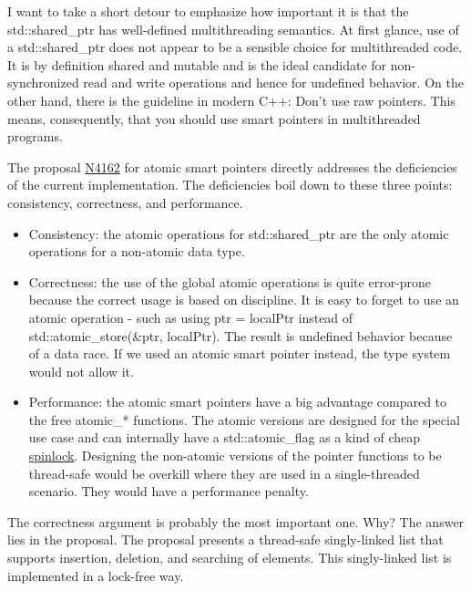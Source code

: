 \begin{tcolorbox}[colback=blue!5!white,colframe=blue!75!black,title={The Importance of being Thread-Safe}]
	
I want to take a short detour to emphasize how important it is that the std::shared\_ptr has well-defined multithreading semantics. At first glance, use of a std::shared\_ptr does not appear to be a sensible choice for multithreaded code. It is by definition shared and mutable and is the ideal candidate for non-synchronized read and write operations and hence for undefined behavior. On the other hand, there is the guideline in modern C++: Don’t use raw pointers. This means, consequently, that you should use smart pointers in multithreaded programs.
	
\end{tcolorbox}

The proposal \href{http://wg21.link/n4162}{N4162} for atomic smart pointers directly addresses the deficiencies of the current implementation. The deficiencies boil down to these three points: consistency, correctness, and performance.

\begin{itemize}
\item 
Consistency: the atomic operations for std::shared\_ptr are the only atomic operations for a non-atomic data type.

\item 
Correctness: the use of the global atomic operations is quite error-prone because the correct usage is based on discipline. It is easy to forget to use an atomic operation - such as using ptr = localPtr instead of std::atomic\_store(\&ptr, localPtr). The result is undefined behavior because of a data race. If we used an atomic smart pointer instead, the type system would not allow it.

\item 
Performance: the atomic smart pointers have a big advantage compared to the free atomic\_* functions. The atomic versions are designed for the special use case and can internally have a std::atomic\_flag as a kind of cheap \href{https://en.wikipedia.org/wiki/Spinlock}{spinlock}. Designing the non-atomic versions of the pointer functions to be thread-safe would be overkill where they are used in a single-threaded scenario. They would have a performance penalty.
\end{itemize}

The correctness argument is probably the most important one. Why? The answer lies in the proposal. The proposal presents a thread-safe singly-linked list that supports insertion, deletion, and searching of elements. This singly-linked list is implemented in a lock-free way.

